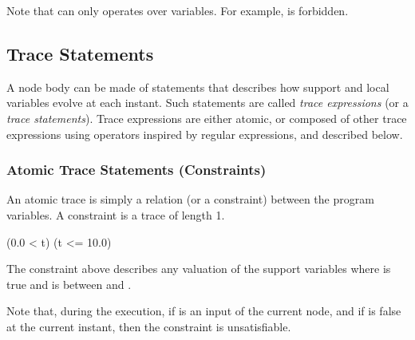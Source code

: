 Note that  can only operates over variables. For example,
  is forbidden.


\subsection{Trace Statements}


A node body can be made  of statements that describes how support and
local variables  evolve at each instant.  Such  statements are called
{\em  trace  expressions}  (or  a  {\em  trace  statements}).   Trace
expressions are either atomic, or composed of other trace expressions
using operators inspired by regular expressions, and described below.


\subsubsection{Atomic Trace Statements (Constraints)}


An atomic  trace is simply a  relation (or a  constraint) between the
program variables.  A constraint is a trace of length 1.


\begin{example}
\begin{program}
  (0.0 < t)  (t <= 10.0)
\end{program}

 The  constraint  above  describes   any  valuation  of  the  support
 variables where  is true and  is between  and
 .
\end{example}

Note  that, during  the  execution, if    is an  input of  the
current node, and if  is  false at the current instant, then
the constraint is unsatisfiable.








